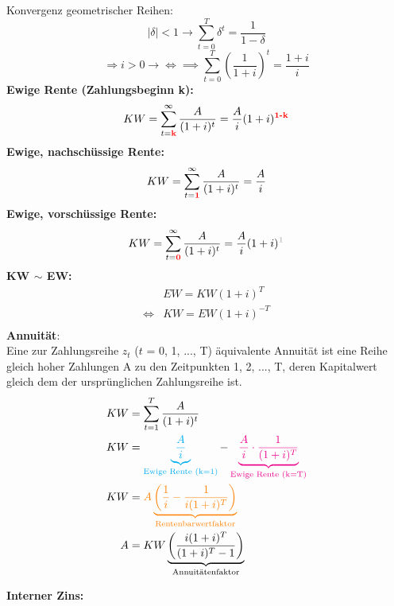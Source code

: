 \documentclass[a4paper]{scrartcl}
\begin{document}
\begin{multicols}{3}
\color{gray}
Konvergenz geometrischer Reihen:
$$|\delta|<1 \rightarrow \sum^T_{t=0}\delta^t=\frac{1}{1-\delta}$$
$$ \Rightarrow i > 0 \rightarrow \iff \implies \sum^T_{t=0}\left(\frac{1}{1+i}\right)^t  = \frac{1+i}{i}$$
\color{black}
\textbf{Ewige Rente (Zahlungsbeginn k):}
$$KW = \sum^{\infty}_{t=\color{red}{\textbf{k}}}\frac{A}{(1+i)^t}=\frac{A}{i}(1+i)^{\color{red}{\textbf{1-k}}}$$
\textbf{Ewige, nachschüssige Rente:}
$$KW = \sum^{\infty}_{t=\color{red}{\textbf{1}}}\frac{A}{(1+i)^t}=\frac{A}{i}$$
\textbf{Ewige, vorschüssige  Rente:}
$$KW = \sum^{\infty}_{t=\color{red}{\textbf{0}}}\frac{A}{(1+i)^t}=\frac{A}{i}(1+i)^{\color{lightgray}{\textbf{1}}}$$
\textbf{KW $\sim$ EW:}
\begin{equation*}
\begin{split}
&EW = KW (1+i)^{T}\\
\iff &KW = EW (1+i)^{-T} \\
\end{split}
\end{equation*}
\textbf{Annuität}:\\
Eine zur Zahlungsreihe $z_t$ ($t$ = 0, 1, ..., T) äquivalente Annuität ist eine Reihe 
gleich hoher Zahlungen A zu den Zeitpunkten 1, 2, ..., T, deren Kapitalwert 
gleich dem der ursprünglichen Zahlungsreihe ist.
\begin{equation*}
\begin{split}
KW &= \sum^T_{t=1}\frac{A}{(1+i)^t}\\
KW &= \color{cyan}\underbrace{\frac{A}{i}}_\text{Ewige Rente (k=1)}
      \color{black}-
      \color{magenta}\underbrace{\frac{A}{i}\cdot\frac{1}{(1+i)^T}}_\text{Ewige Rente (k=T)}\\
KW &= \color{orange}A \underbrace{\left(\frac{1}{i}-\frac{1}{i(1+i)^T}\right)}_\text{Rentenbarwertfaktor}\\
A  &= KW \underbrace{\left(\frac{i(1+i)^T}{(1+i)^T-1}\right)}_\text{Annuitätenfaktor}\\
\end{split}
\end{equation*}
\begin{center}
\end{center}
\textbf{Interner Zins:}


\end{multicols}
\end{document}

